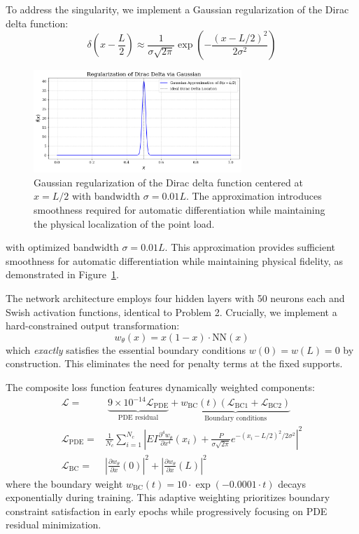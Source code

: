 \documentclass[12pt]{article}
\begin{document}
To address the singularity, we implement a Gaussian regularization of the Dirac delta function:
\[
\delta\left(x - \frac{L}{2}\right) \approx \frac{1}{\sigma\sqrt{2\pi}} \exp\left(-\frac{(x - L/2)^2}{2\sigma^2}\right)
\]

\begin{figure}[htbp]
  \centering
  \includegraphics[width=0.7\textwidth]{figure_delta_regularization.png}
  \caption{Gaussian regularization of the Dirac delta function centered at $x = L/2$ with bandwidth $\sigma = 0.01L$. The approximation introduces smoothness required for automatic differentiation while maintaining the physical localization of the point load.}
  \label{fig:delta_approximation}
\end{figure}


with optimized bandwidth $\sigma = 0.01L$. This approximation provides sufficient smoothness for automatic differentiation while maintaining physical fidelity, as demonstrated in Figure~\ref{fig:delta_approximation}.

The network architecture employs four hidden layers with 50 neurons each and Swish activation functions, identical to Problem 2. Crucially, we implement a hard-constrained output transformation:
\[
w_{\theta}(x) = x(1-x) \cdot \text{NN}(x)
\]
which \textit{exactly} satisfies the essential boundary conditions $w(0) = w(L) = 0$ by construction. This eliminates the need for penalty terms at the fixed supports.

The composite loss function features dynamically weighted components:
\begin{align*}
\mathcal{L} = &\; \underbrace{9 \times 10^{-14} \mathcal{L}_{\text{PDE}}}_{\text{PDE residual}} + \underbrace{w_{\text{BC}}(t) \left( \mathcal{L}_{\text{BC1}} + \mathcal{L}_{\text{BC2}} \right)}_{\text{Boundary conditions}} \\
\mathcal{L}_{\text{PDE}} = &\frac{1}{N_c} \sum_{i=1}^{N_c} \left|EI \frac{\partial^4 w_\theta}{\partial x^4}(x_i) + \frac{P}{\sigma\sqrt{2\pi}} e^{-(x_i-L/2)^2/2\sigma^2} \right|^2 \\
\mathcal{L}_{\text{BC}} = &\left|\frac{\partial w_\theta}{\partial x}(0)\right|^2 + \left|\frac{\partial w_\theta}{\partial x}(L)\right|^2
\end{align*}
where the boundary weight $w_{\text{BC}}(t) = 10 \cdot \exp(-0.0001 \cdot t)$ decays exponentially during training. This adaptive weighting prioritizes boundary constraint satisfaction in early epochs while progressively focusing on PDE residual minimization.
\end{document}
